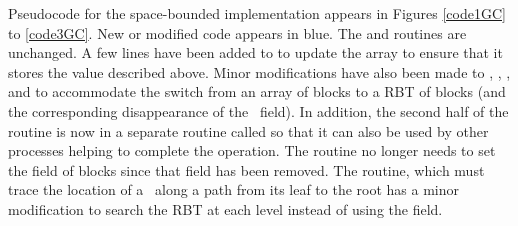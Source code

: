 Pseudocode for the space-bounded implementation appears in Figures \ref{code1GC} to \ref{code3GC}.
New or modified code appears in blue.
The  and  routines are unchanged.
A few lines have been added to  to update the  array
to ensure that it stores the value described above.
Minor modifications have also
been made to , , ,  and 
to accommodate  the switch from an array of blocks to a RBT of blocks (and the corresponding disappearance
of the \head\ field).
In addition, the second half of the  routine is now in a
separate routine called  so that it can also be used by other processes
helping to complete the operation.
The  routine no longer needs to set the  field of blocks since
that field has been removed.
The  routine, which must trace the location of a \dequeue\ along
a path from its leaf to the root has a minor modification to search the  RBT at 
each level instead of using the  field.


\renewcommand{\algorithmiccomment}[1]{\hfill\eqparbox{COMMENTDOUBLE}{\com\ #1}}

